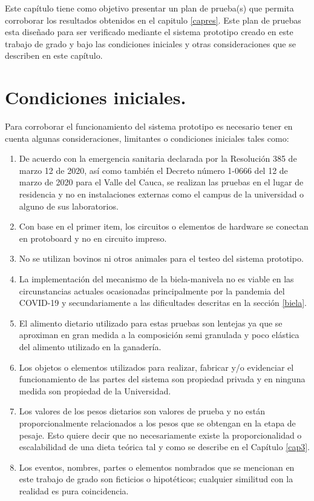 
Este capítulo tiene como objetivo presentar un plan de prueba(s) que permita corroborar los resultados obtenidos en el capitulo \ref{capres}. Este plan de pruebas esta diseñado para ser verificado mediante el sistema prototipo creado en este trabajo de grado y bajo las condiciones iniciales y otras consideraciones que se describen en este capítulo.

\section{Condiciones iniciales.}
Para corroborar el funcionamiento del sistema prototipo es necesario tener en cuenta algunas consideraciones, limitantes o condiciones iniciales tales como:

\begin{enumerate}
    \item De acuerdo con la emergencia sanitaria declarada por la Resolución 385 de marzo 12 de 2020, así como también el Decreto número 1-0666 del 12 de marzo de 2020 para el Valle del Cauca, se realizan las pruebas en el lugar de residencia y no en instalaciones externas como el campus de la universidad o alguno de sus laboratorios.
    \item Con base en el primer item, los circuitos o elementos de hardware se conectan en protoboard y no en circuito impreso.
    \item No se utilizan bovinos ni otros animales para el testeo del sistema prototipo.
    \item La implementación del mecanismo de la biela-manivela no es viable en las circunstancias actuales ocasionadas principalmente por la pandemia del COVID-19 y secundariamente a las dificultades descritas en la sección \ref{biela}.
    \item El alimento dietario utilizado para estas pruebas son lentejas ya que se aproximan en gran medida a la composición semi granulada y poco elástica del alimento utilizado en la ganadería.
    \item Los objetos o elementos utilizados para realizar, fabricar y/o evidenciar el funcionamiento de las partes del sistema son propiedad privada y en ninguna medida son propiedad de la Universidad.
    \item Los valores de los pesos dietarios son valores de prueba y no están proporcionalmente relacionados a los pesos que se obtengan en la etapa de pesaje. Esto quiere decir que no necesariamente existe la proporcionalidad o escalabilidad de una dieta teórica tal y como se describe en el Capítulo \ref{cap3}.
    \item Los eventos, nombres, partes o elementos nombrados que se mencionan en este trabajo de grado son ficticios o hipotéticos; cualquier similitud con la realidad es pura coincidencia.
\end{enumerate}

